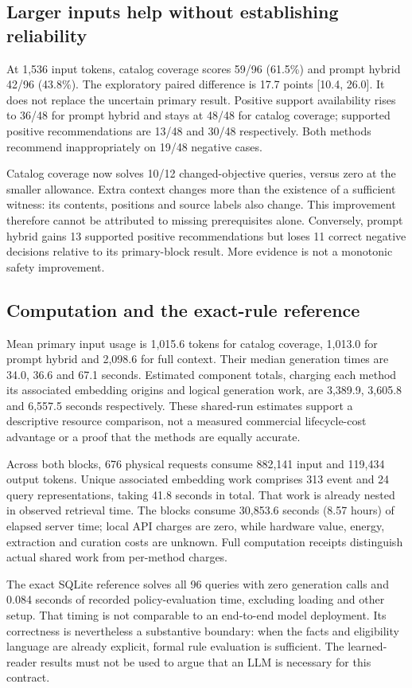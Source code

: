 \subsection{Larger inputs help without establishing reliability}
At 1,536 input tokens, catalog coverage scores 59/96 (61.5\%) and prompt hybrid 42/96 (43.8\%). The exploratory paired difference is 17.7 points [10.4, 26.0]. It does not replace the uncertain primary result. Positive support availability rises to 36/48 for prompt hybrid and stays at 48/48 for catalog coverage; supported positive recommendations are 13/48 and 30/48 respectively. Both methods recommend inappropriately on 19/48 negative cases.

Catalog coverage now solves 10/12 changed-objective queries, versus zero at the smaller allowance. Extra context changes more than the existence of a sufficient witness: its contents, positions and source labels also change. This improvement therefore cannot be attributed to missing prerequisites alone. Conversely, prompt hybrid gains 13 supported positive recommendations but loses 11 correct negative decisions relative to its primary-block result. More evidence is not a monotonic safety improvement.

\subsection{Computation and the exact-rule reference}
Mean primary input usage is 1,015.6 tokens for catalog coverage, 1,013.0 for prompt hybrid and 2,098.6 for full context. Their median generation times are 34.0, 36.6 and 67.1 seconds. Estimated component totals, charging each method its associated embedding origins and logical generation work, are 3,389.9, 3,605.8 and 6,557.5 seconds respectively. These shared-run estimates support a descriptive resource comparison, not a measured commercial lifecycle-cost advantage or a proof that the methods are equally accurate.

Across both blocks, 676 physical requests consume 882,141 input and 119,434 output tokens. Unique associated embedding work comprises 313 event and 24 query representations, taking 41.8 seconds in total. That work is already nested in observed retrieval time. The blocks consume 30,853.6 seconds (8.57 hours) of elapsed server time; local API charges are zero, while hardware value, energy, extraction and curation costs are unknown. Full computation receipts distinguish actual shared work from per-method charges.

The exact SQLite reference solves all 96 queries with zero generation calls and 0.084 seconds of recorded policy-evaluation time, excluding loading and other setup. That timing is not comparable to an end-to-end model deployment. Its correctness is nevertheless a substantive boundary: when the facts and eligibility language are already explicit, formal rule evaluation is sufficient. The learned-reader results must not be used to argue that an LLM is necessary for this contract.
